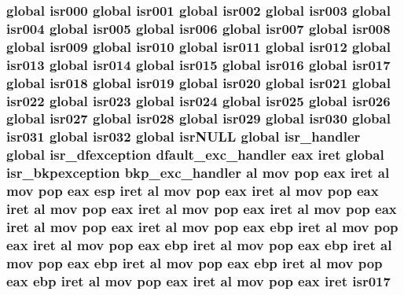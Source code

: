 \subsubsection[{\texorpdfstring{isr017}{isr017}}]{\setlength{\rightskip}{0pt plus 5cm}global {\bf isr000} global {\bf isr001} global {\bf isr002} global {\bf isr003} global {\bf isr004} global {\bf isr005} global {\bf isr006} global {\bf isr007} global {\bf isr008} global {\bf isr009} global {\bf isr010} global {\bf isr011} global {\bf isr012} global {\bf isr013} global {\bf isr014} global {\bf isr015} global {\bf isr016} global isr017 global {\bf isr018} global {\bf isr019} global {\bf isr020} global {\bf isr021} global {\bf isr022} global {\bf isr023} global {\bf isr024} global {\bf isr025} global {\bf isr026} global {\bf isr027} global {\bf isr028} global {\bf isr029} global {\bf isr030} global {\bf isr031} global isr032 global isr\+N\+U\+LL global isr\+\_\+handler global {\bf isr\+\_\+dfexception} {\bf dfault\+\_\+exc\+\_\+handler} eax iret global {\bf isr\+\_\+bkpexception} {\bf bkp\+\_\+exc\+\_\+handler} {\bf al} {\bf mov} pop eax iret {\bf al} {\bf mov} pop eax esp iret {\bf al} {\bf mov} pop eax iret {\bf al} {\bf mov} pop eax iret {\bf al} {\bf mov} pop eax iret {\bf al} {\bf mov} pop eax iret {\bf al} {\bf mov} pop eax iret {\bf al} {\bf mov} pop eax iret {\bf al} {\bf mov} pop eax ebp iret {\bf al} {\bf mov} pop eax iret {\bf al} {\bf mov} pop eax ebp iret {\bf al} {\bf mov} pop eax ebp iret {\bf al} {\bf mov} pop eax ebp iret {\bf al} {\bf mov} pop eax ebp iret {\bf al} {\bf mov} pop eax ebp iret {\bf al} {\bf mov} pop eax iret {\bf al} {\bf mov} pop eax iret isr017}\hypertarget{isrs_8as_aa6980820a5b8a62a087be02bc2bd51d4}{}\label{isrs_8as_aa6980820a5b8a62a087be02bc2bd51d4}
